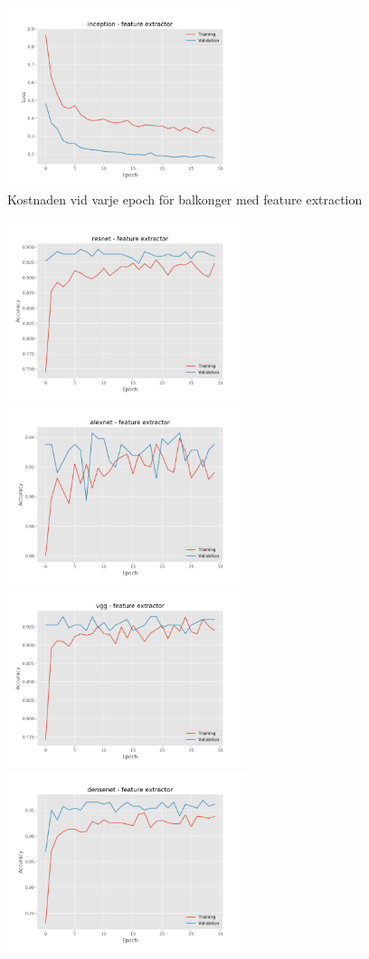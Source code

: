 \documentclass[]{kththesis}
\begin{document}
\begin{figure}[h]
  \includegraphics[width=7cm]{b_l_inception_fe}
  \caption{Kostnaden vid varje epoch för balkonger med feature extraction}
  \label{fig:b_l_1}
\end{figure}
\begin{figure}[h]
  \includegraphics[width=7cm]{b_a_resnet_fe}
  \includegraphics[width=7cm]{b_a_alexnet_fe}
  \includegraphics[width=7cm]{b_a_vgg_fe}
  \includegraphics[width=7cm]{b_a_densenet_fe}

\end{figure}
\end{document}

